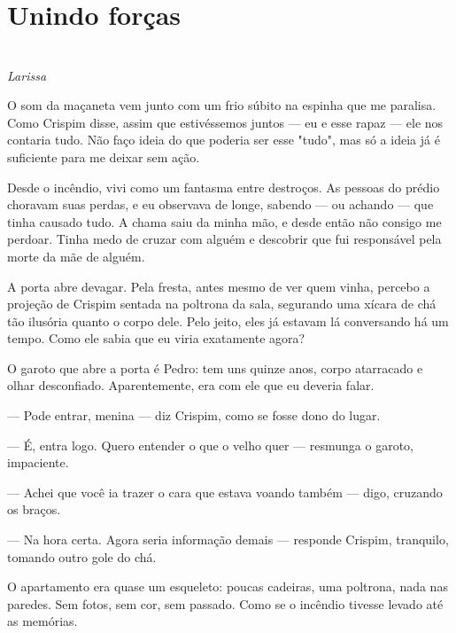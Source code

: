 \newpage

\ifdefined\useChapters
\chapter{Unindo forças}
\else
\chapter{}
\fi

\begin{center}
\textit{Larissa}
\end{center}

O som da maçaneta vem junto com um frio súbito na espinha que me paralisa.
Como Crispim disse, assim que estivéssemos juntos — eu e esse rapaz — ele nos contaria tudo.  
Não faço ideia do que poderia ser esse "tudo", mas só a ideia já é suficiente para me deixar sem ação.

Desde o incêndio, vivi como um fantasma entre destroços.  
As pessoas do prédio choravam suas perdas, e eu observava de longe, sabendo — ou achando — que tinha causado tudo.  
A chama saiu da minha mão, e desde então não consigo me perdoar.  
Tinha medo de cruzar com alguém e descobrir que fui responsável pela morte da mãe de alguém.

A porta abre devagar. Pela fresta, antes mesmo de ver quem vinha, percebo a projeção de Crispim sentada na poltrona da sala, segurando uma xícara de chá tão ilusória quanto o corpo dele.
Pelo jeito, eles já estavam lá conversando há um tempo.  
Como ele sabia que eu viria exatamente agora?

O garoto que abre a porta é Pedro: tem uns quinze anos, corpo atarracado e olhar desconfiado.
Aparentemente, era com ele que eu deveria falar.

— Pode entrar, menina — diz Crispim, como se fosse dono do lugar.

— É, entra logo. Quero entender o que o velho quer — resmunga o garoto, impaciente.

— Achei que você ia trazer o cara que estava voando também — digo, cruzando os braços.

— Na hora certa. Agora seria informação demais — responde Crispim, tranquilo, tomando outro gole do chá.

O apartamento era quase um esqueleto: poucas cadeiras, uma poltrona, nada nas paredes.  
Sem fotos, sem cor, sem passado.  
Como se o incêndio tivesse levado até as memórias.

